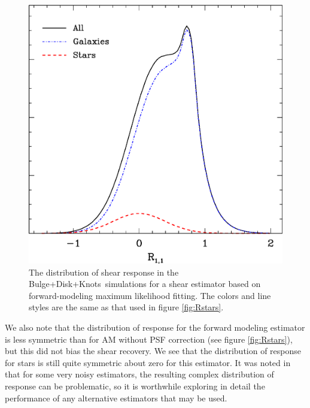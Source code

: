 \documentclass[iop]{emulateapj}
\newcommand{\bdkfull}{Bulge+Disk+Knots}
\begin{document}
\begin{figure}[h]
	\centering
    \includegraphics[width=0.5\columnwidth]{R-bd29-bd29stars.eps}

    \caption{The distribution of shear response in the \bdkfull\ simulations
    for a shear estimator based on  forward-modeling maximum likelihood fitting.
    The colors and line styles are the same as that used 
    in figure \ref{fig:Rstars}.}

\label{fig:Rmaxlike}
\end{figure}

We also note that the distribution of response for the forward modeling
estimator is less symmetric than for AM without PSF correction (see figure
\ref{fig:Rstars}), but this did not bias the shear recovery.  We see that the
distribution of response for stars is still quite symmetric about zero for this
estimator.  It was noted in \cite{HuffMcal} that for some very noisy
estimators, the resulting complex distribution of response can be problematic,
so it is worthwhile exploring in detail the performance of any alternative
estimators that may be used.




\end{document}

